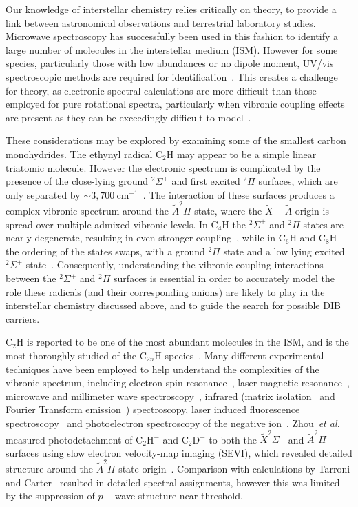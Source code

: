 \documentclass[aip,graphicx]{revtex4-1}
\begin{document}
Our knowledge of interstellar chemistry relies critically on theory, to provide a link between astronomical observations and terrestrial laboratory studies. Microwave spectroscopy has successfully been used in this fashion to identify a large number of molecules in the interstellar medium (ISM). However for some species, particularly those with low abundances or no dipole moment, UV/vis spectroscopic methods are required for identification~\cite{mai97}. This creates a challenge for theory, as electronic spectral calculations are more difficult than those employed for pure rotational spectra, particularly when vibronic coupling effects are present as they can be exceedingly difficult to model~\cite{for10}.

These considerations may be explored by examining some of the smallest carbon monohydrides. The ethynyl radical C$_2$H may appear to be a simple linear triatomic molecule. However the electronic spectrum is complicated by the presence of the close-lying ground $^2\Sigma^+$ and first excited $^2\Pi$ surfaces, which are only separated by $\sim3,700~$cm$^{-1}$~\cite{cur85,tar03}. The interaction of these surfaces produces a complex vibronic spectrum around the $\tilde{A}^2\Pi$ state, where the $\tilde{X}-\tilde{A}$ origin is spread over multiple admixed vibronic levels. In C$_4$H the $^2\Sigma^+$ and $^2\Pi$ states are nearly degenerate, resulting in even stronger coupling~\cite{zho07b}, while in C$_6$H and C$_8$H the ordering of the states swaps, with a ground $^2\Pi$ state and a low lying excited $^2\Sigma^+$ state~\cite{lin99,tay98}. Consequently, understanding the vibronic coupling interactions between the $^2\Sigma^+$ and $^2\Pi$ surfaces is essential in order to accurately model the role these radicals (and their corresponding anions) are likely to play in the interstellar chemistry discussed above, and to guide the search for possible DIB carriers.

C$_2$H is reported to be one of the most abundant molecules in the ISM, and is the most thoroughly studied of the C$_{2n}$H species~\cite{wil91,hei99,for10}. Many different experimental techniques have been employed to help understand the complexities of the vibronic spectrum, including electron spin resonance~\cite{coc64,jin85}, laser magnetic resonance~\cite{bro88,pfe96,sch98}, microwave and millimeter wave spectroscopy~\cite{sas81,got83,end89,mul00}, infrared (matrix isolation~\cite{she87,jac87,for95} and Fourier Transform emission~\cite{ver88}) spectroscopy, laser induced fluorescence spectroscopy~\cite{hsu93,hsu95,chi99} and photoelectron spectroscopy of the negative ion~\cite{erv91,tay98,zho07}. Zhou~\emph{et al.} measured photodetachment of C$_2$H$^-$ and C$_2$D$^-$ to both the $\tilde{X} ^2\Sigma^+$ and $\tilde{A} ^2\Pi$ surfaces using slow electron velocity-map imaging (SEVI), which revealed detailed structure around the $\tilde{A} ^2\Pi$ state origin~\cite{zho07}. Comparison with calculations by Tarroni and Carter~\cite{tar03} resulted in detailed spectral assignments, however this was limited by the suppression of $p-$wave structure near threshold.
\end{document}
